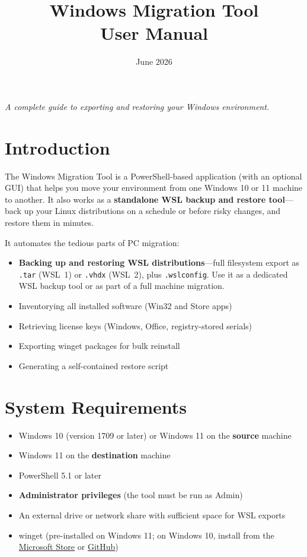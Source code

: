 \documentclass[11pt,a4paper]{article}
\title{\textbf{Windows Migration Tool}\\[0.5em]\large User Manual}
\author{}
\date{June 2026}
\begin{document}
\maketitle
\thispagestyle{empty}
\vfill
\begin{center}
\textit{A complete guide to exporting and restoring your Windows environment.}
\end{center}
\newpage

\tableofcontents
\newpage

\section{Introduction}

The Windows Migration Tool is a PowerShell-based application (with an optional GUI) that helps you move your environment from one Windows 10 or 11 machine to another. It also works as a \textbf{standalone WSL backup and restore tool}---back up your Linux distributions on a schedule or before risky changes, and restore them in minutes.

It automates the tedious parts of PC migration:

\begin{itemize}
    \item \textbf{Backing up and restoring WSL distributions}---full filesystem export as \texttt{.tar} (WSL~1) or \texttt{.vhdx} (WSL~2), plus \texttt{.wslconfig}. Use it as a dedicated WSL backup tool or as part of a full machine migration.
    \item Inventorying all installed software (Win32 and Store apps)
    \item Retrieving license keys (Windows, Office, registry-stored serials)
    \item Exporting winget packages for bulk reinstall
    \item Generating a self-contained restore script
\end{itemize}

\section{System Requirements}

\begin{itemize}
    \item Windows 10 (version 1709 or later) or Windows 11 on the \textbf{source} machine
    \item Windows 11 on the \textbf{destination} machine
    \item PowerShell 5.1 or later
    \item \textbf{Administrator privileges} (the tool must be run as Admin)
    \item An external drive or network share with sufficient space for WSL exports
    \item winget (pre-installed on Windows 11; on Windows 10, install from the \href{https://apps.microsoft.com/detail/9NBLGGH4NNS1}{Microsoft Store} or \href{https://github.com/microsoft/winget-cli/releases}{GitHub})
\end{itemize}
\end{document}
